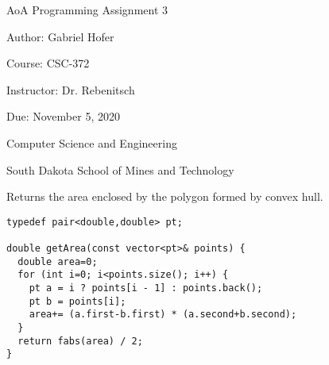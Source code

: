 \documentclass[12pt]{article}
\begin{document}
\begin{titlepage}
   \begin{center}
       \vspace*{1cm}
       \Large
       AoA Programming Assignment 3
       \normalsize

       \vspace{0.5cm}

       Author: Gabriel Hofer

       \vspace{0.5cm}

       Course: CSC-372

       \vspace{0.5cm}

       Instructor: Dr. Rebenitsch
       \vspace{0.5cm}

       Due: November 5, 2020

       \vfill

       Computer Science and Engineering\

       South Dakota School of Mines and Technology\
   \end{center}
\end{titlepage}
\newpage


Returns the area enclosed by the polygon formed by convex hull.
\begin{lstlisting}[frame=single] 
typedef pair<double,double> pt;

double getArea(const vector<pt>& points) {
  double area=0;
  for (int i=0; i<points.size(); i++) {
    pt a = i ? points[i - 1] : points.back();
    pt b = points[i];
    area+= (a.first-b.first) * (a.second+b.second);
  }
  return fabs(area) / 2;
}
\end{lstlisting}
\end{document}
